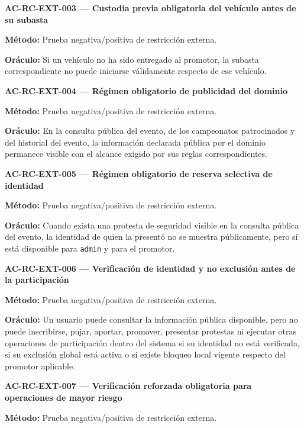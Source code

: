 \documentclass[10pt,letterpaper]{article}
\begin{document}
\noindent\textbf{AC-RC-EXT-003 --- Custodia previa obligatoria del vehículo antes de su subasta}\par
\textbf{Método:} Prueba negativa/positiva de restricción externa.\par
\textbf{Oráculo:} Si un vehículo no ha sido entregado al promotor, la subasta correspondiente no puede iniciarse válidamente respecto de ese vehículo.\par\vspace{0.45em}
\noindent\textbf{AC-RC-EXT-004 --- Régimen obligatorio de publicidad del dominio}\par
\textbf{Método:} Prueba negativa/positiva de restricción externa.\par
\textbf{Oráculo:} En la consulta pública del evento, de los campeonatos patrocinados y del historial del evento, la información declarada pública por el dominio permanece visible con el alcance exigido por sus reglas correspondientes.\par\vspace{0.45em}
\noindent\textbf{AC-RC-EXT-005 --- Régimen obligatorio de reserva selectiva de identidad}\par
\textbf{Método:} Prueba negativa/positiva de restricción externa.\par
\textbf{Oráculo:} Cuando exista una protesta de seguridad visible en la consulta pública del evento, la identidad de quien la presentó no se muestra públicamente, pero sí está disponible para \texttt{admin} y para el promotor.\par\vspace{0.45em}
\noindent\textbf{AC-RC-EXT-006 --- Verificación de identidad y no exclusión antes de la participación}\par
\textbf{Método:} Prueba negativa/positiva de restricción externa.\par
\textbf{Oráculo:} Un usuario puede consultar la información pública disponible, pero no puede inscribirse, pujar, aportar, promover, presentar protestas ni ejecutar otras operaciones de participación dentro del sistema si su identidad no está verificada, si su exclusión global está activa o si existe bloqueo local vigente respecto del promotor aplicable.\par\vspace{0.45em}
\noindent\textbf{AC-RC-EXT-007 --- Verificación reforzada obligatoria para operaciones de mayor riesgo}\par
\textbf{Método:} Prueba negativa/positiva de restricción externa.\par
\end{document}
